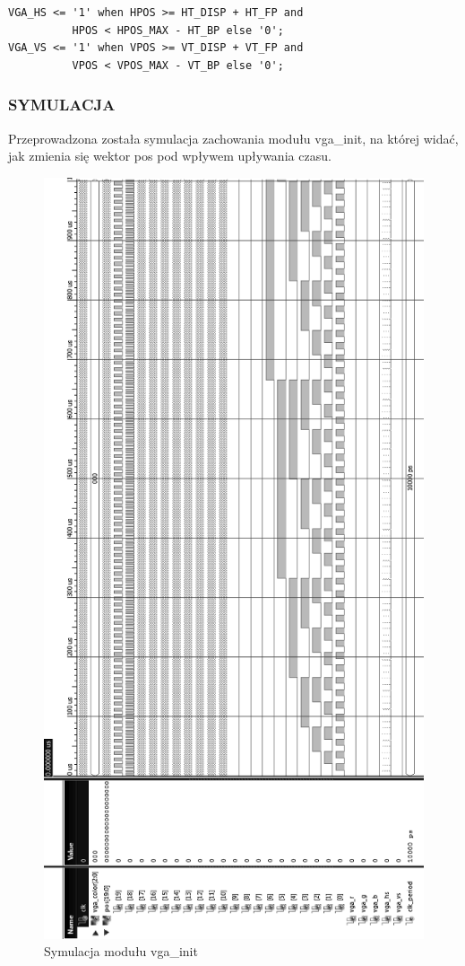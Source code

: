 \documentclass[11pt]{article}
\begin{document}
\begin{lstlisting}[caption=Sterowanie pozycją piksela]
VGA_HS <= '1' when HPOS >= HT_DISP + HT_FP and
          HPOS < HPOS_MAX - HT_BP else '0';
VGA_VS <= '1' when VPOS >= VT_DISP + VT_FP and
          VPOS < VPOS_MAX - VT_BP else '0';
\end{lstlisting}
\newpage
\subsubsection{SYMULACJA}

Przeprowadzona została symulacja zachowania modułu vga\_init, na której widać, jak zmienia się wektor pos pod wpływem upływania czasu.

\begin{figure}[H]
\center
\includegraphics[scale=.6]{symulacja_vga.png}
\caption{Symulacja modułu vga\_init}
\end{figure}
\end{document}
